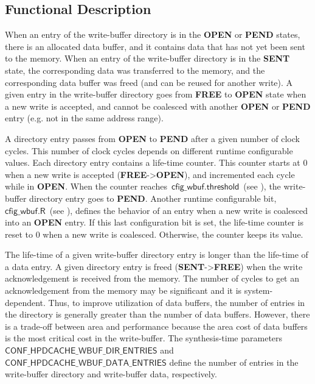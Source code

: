 \documentclass[10pt,titlepage,twoside]{book}
\begin{document}
\subsection{Functional Description}

When an entry of the write-buffer directory is in the \textbf{OPEN} or \textbf{PEND} states, there is an allocated data buffer, and it contains data that has not yet been sent to the memory.
When an entry of the write-buffer directory is in the \textbf{SENT} state, the corresponding data was transferred to the memory, and the corresponding data buffer was freed (and can be reused for another write).
A given entry in the write-buffer directory goes from \textbf{FREE} to \textbf{OPEN} state when a new write is accepted, and cannot be coalesced with another \textbf{OPEN} or \textbf{PEND} entry (e.g. not in the same address range).

A directory entry passes from \textbf{OPEN} to \textbf{PEND} after a given number of clock cycles.
This number of clock cycles depends on different runtime configurable values.
Each directory entry contains a life-time counter.
This counter starts at 0 when a new write is accepted (\textbf{FREE}->\textbf{OPEN}), and incremented each cycle while in \textbf{OPEN}.
When the counter reaches~$\mathsf{cfig\_wbuf.threshold}$~(see ), the write-buffer directory entry goes to \textbf{PEND}.
Another runtime configurable bit, $\mathsf{cfig\_wbuf.R}$~(see ), defines the behavior of an entry when a new write is coalesced into an \textbf{OPEN} entry.
If this last configuration bit is set, the life-time counter is reset to 0 when a new write is coalesced.
Otherwise, the counter keeps its value.

The life-time of a given write-buffer directory entry is longer than the life-time of a data entry.
A given directory entry is freed (\textbf{SENT}->\textbf{FREE}) when the write acknowledgement is received from the memory.
The number of cycles to get an acknowledgement from the memory may be significant and it is system-dependent.
Thus, to improve utilization of data buffers, the number of entries in the directory is generally greater than the number of data buffers.
However, there is a trade-off between area and performance because the area cost of data buffers is the most critical cost in the write-buffer.
The synthesis-time parameters $\mathsf{CONF\_HPDCACHE\_WBUF\_DIR\_ENTRIES}$ and $\mathsf{CONF\_HPDCACHE\_WBUF\_DATA\_ENTRIES}$ define the number of entries in the write-buffer directory and write-buffer data, respectively.
\end{document}
